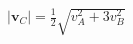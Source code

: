 \documentclass[border=2.5pt]{standalone}
\begin{document}
$\displaystyle \boxed{|\boldsymbol v_C|=\frac12\sqrt{v_A^2+3v_B^2}}$
\end{document}
